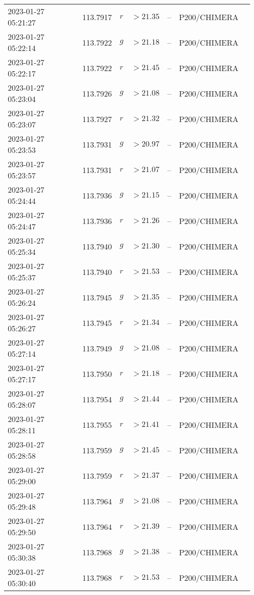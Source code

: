 \documentclass{nature_plusfigure}
\begin{document}
\begin{supplement}
\begin{center}
\begin{longtable}{lllllll}
2023-01-27 05:21:27 & 113.7917 & $r$ & $>21.35$ & -- & P200/CHIMERA &  \\ 
2023-01-27 05:22:14 & 113.7922 & $g$ & $>21.18$ & -- & P200/CHIMERA &  \\ 
2023-01-27 05:22:17 & 113.7922 & $r$ & $>21.45$ & -- & P200/CHIMERA &  \\ 
2023-01-27 05:23:04 & 113.7926 & $g$ & $>21.08$ & -- & P200/CHIMERA &  \\ 
2023-01-27 05:23:07 & 113.7927 & $r$ & $>21.32$ & -- & P200/CHIMERA &  \\ 
2023-01-27 05:23:53 & 113.7931 & $g$ & $>20.97$ & -- & P200/CHIMERA &  \\ 
2023-01-27 05:23:57 & 113.7931 & $r$ & $>21.07$ & -- & P200/CHIMERA &  \\ 
2023-01-27 05:24:44 & 113.7936 & $g$ & $>21.15$ & -- & P200/CHIMERA &  \\ 
2023-01-27 05:24:47 & 113.7936 & $r$ & $>21.26$ & -- & P200/CHIMERA &  \\ 
2023-01-27 05:25:34 & 113.7940 & $g$ & $>21.30$ & -- & P200/CHIMERA &  \\ 
2023-01-27 05:25:37 & 113.7940 & $r$ & $>21.53$ & -- & P200/CHIMERA &  \\ 
2023-01-27 05:26:24 & 113.7945 & $g$ & $>21.35$ & -- & P200/CHIMERA &  \\ 
2023-01-27 05:26:27 & 113.7945 & $r$ & $>21.34$ & -- & P200/CHIMERA &  \\ 
2023-01-27 05:27:14 & 113.7949 & $g$ & $>21.08$ & -- & P200/CHIMERA &  \\ 
2023-01-27 05:27:17 & 113.7950 & $r$ & $>21.18$ & -- & P200/CHIMERA &  \\ 
2023-01-27 05:28:07 & 113.7954 & $g$ & $>21.44$ & -- & P200/CHIMERA &  \\ 
2023-01-27 05:28:11 & 113.7955 & $r$ & $>21.41$ & -- & P200/CHIMERA &  \\ 
2023-01-27 05:28:58 & 113.7959 & $g$ & $>21.45$ & -- & P200/CHIMERA &  \\ 
2023-01-27 05:29:00 & 113.7959 & $r$ & $>21.37$ & -- & P200/CHIMERA &  \\ 
2023-01-27 05:29:48 & 113.7964 & $g$ & $>21.08$ & -- & P200/CHIMERA &  \\ 
2023-01-27 05:29:50 & 113.7964 & $r$ & $>21.39$ & -- & P200/CHIMERA &  \\ 
2023-01-27 05:30:38 & 113.7968 & $g$ & $>21.38$ & -- & P200/CHIMERA &  \\ 
2023-01-27 05:30:40 & 113.7968 & $r$ & $>21.53$ & -- & P200/CHIMERA &  \\ 

\end{longtable}
\end{center}
\end{supplement}
\end{document}
